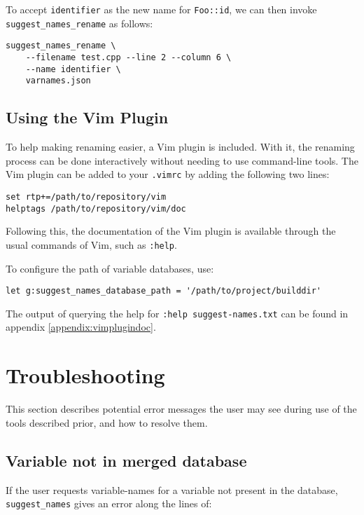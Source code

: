 To accept \lstinline|identifier| as the new name for \lstinline|Foo::id|, we can
then invoke \lstinline|suggest_names_rename| as follows:
\begin{lstlisting}[caption={Invocation of \lstinline|suggest_name_rename|}]
suggest_names_rename \
	--filename test.cpp --line 2 --column 6 \
	--name identifier \
	varnames.json
\end{lstlisting}

\subsection{Using the Vim Plugin}
To help making renaming easier, a Vim \cite{vim} plugin is included.
With it, the renaming process can be done interactively without needing to use
command-line tools.
The Vim plugin can be added to your \lstinline|.vimrc| by adding the following
two lines:

\begin{lstlisting}[language=vimscript, caption={Adding the Vim plugin}]
set rtp+=/path/to/repository/vim
helptags /path/to/repository/vim/doc
\end{lstlisting}

Following this, the documentation of the Vim plugin is available through the
usual commands of Vim, such as \lstinline|:help|.

To configure the path of variable databases, use:

\begin{lstlisting}[language=vimscript, caption={Setting Databases Path}]
let g:suggest_names_database_path = '/path/to/project/builddir'
\end{lstlisting}

The output of querying the help for \lstinline|:help suggest-names.txt| can be
found in appendix \ref{appendix:vimplugindoc}.

\section{Troubleshooting}
\label{sec:troubleshooting}
This section describes potential error messages the user may see during use of
the tools described prior, and how to resolve them.

\subsection{Variable not in merged database}
If the user requests variable-names for a variable not present in the database,
\lstinline|suggest_names| gives an error along the lines of:

